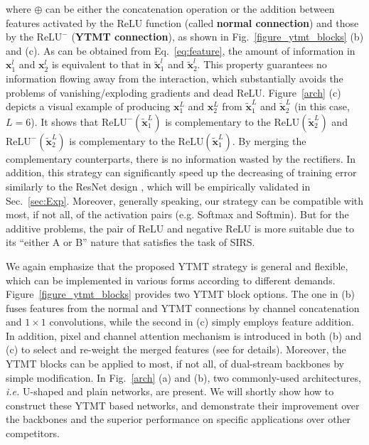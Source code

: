 \documentclass{article}
\begin{document}
where $\oplus$ can be either the concatenation operation or the addition between features activated by the $\mathrm{ReLU}$ function (called \textbf{normal connection}) and those by the $\mathrm{ReLU}^{-}$ (\textbf{YTMT connection}), as shown in Fig.~\ref{figure_ytmt_blocks} (b) and (c). As can be obtained from Eq.~\eqref{eq:feature}, the amount of information in $\mathbf{x}_1^l$ and $\mathbf{x}_2^l$ is equivalent to that in $\mathbf{\tilde{x}}_1^l$ and $\mathbf{\tilde{x}}_2^l$. This property guarantees no information flowing away from the interaction, which substantially avoids the problems of vanishing/exploding gradients and dead ReLU. Figure~\ref{arch} (c) depicts a visual example of producing $\mathbf{{x}}_1^L$ and $\mathbf{{x}}_2^L$ from $\mathbf{\tilde{x}}_1^L$ and $\mathbf{\tilde{x}}_2^L$ (in this case, $L=6$). It shows that $\mathrm{ReLU}^{-}(\mathbf{\tilde{x}}_1^L)$ is complementary to the $\mathrm{ReLU}(\mathbf{\tilde{x}}_2^L)$ and $\mathrm{ReLU}^{-}(\mathbf{\tilde{x}}_2^L)$ is complementary to the $\mathrm{ReLU}(\mathbf{\tilde{x}}_1^L)$. By merging the complementary counterparts, there is no information wasted by the rectifiers.  In addition, this strategy can significantly speed up the decreasing of training error similarly to the ResNet design \cite{DBLP:conf/cvpr/HeZRS16}, which will be empirically validated in Sec.~\ref{sec:Exp}. Moreover, generally speaking, our strategy can be compatible with most, if not all, of the activation pairs (e.g. Softmax and Softmin). But for the additive problems, the pair of ReLU and negative ReLU is more suitable due to its ``either A or B'' nature that satisfies the task of SIRS. 

We again emphasize that the proposed YTMT strategy is general and flexible, which can be implemented in various forms according to different demands. Figure~\ref{figure_ytmt_blocks} provides two YTMT block options. The one in (b) fuses features from the normal and YTMT connections by channel concatenation and $1\times1$ convolutions, while the second in (c) simply employs feature addition. In addition, pixel and channel attention mechanism is introduced in both (b) and (c) to select and re-weight the merged features (see \cite{DBLP:conf/aaai/QinWBXJ20} for details). Moreover, the YTMT blocks can be applied to most, if not all, of dual-stream backbones by simple modification. In Fig.~\ref{arch} (a) and (b), two commonly-used architectures, \emph{i.e.} U-shaped \cite{DBLP:conf/miccai/RonnebergerFB15} and plain \cite{DBLP:journals/tip/ZhangZCM017} networks, are present. We will shortly show how to construct these YTMT based networks, and demonstrate their improvement over the backbones and the superior performance on specific applications over other competitors.
\end{document}
